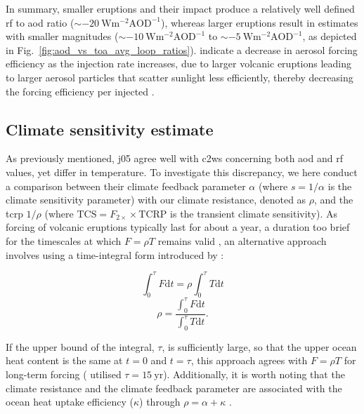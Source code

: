 \documentclass{ametsocV6.1}
\newcommand{\iso}[1][i]{{#1}njected \ce{SO2}}
\begin{document}
In summary, smaller eruptions and their impact produce a relatively well defined
\gls{rf} to \gls{aod} ratio (\(\sim \SI{-20}{\watt\metre^{-2}\mathrm{AOD}^{-1}}\)),
whereas larger eruptions result in estimates with smaller magnitudes (\(\sim
\SI{-10}{\watt\metre^{-2}\mathrm{AOD}^{-1}}\) to \(\sim
\SI{-5}{\watt\metre^{-2}\mathrm{AOD}^{-1}}\), as depicted in
Fig.~\ref{fig:aod_vs_toa_avg_loop_ratios}). \citet{niemeier2017} indicate a decrease in
aerosol forcing efficiency as the injection rate increases, due to larger volcanic
eruptions leading to larger aerosol particles that scatter sunlight less efficiently,
thereby decreasing the forcing efficiency per \iso{} \citep{english2013, timmreck2018}.

\subsection{Climate sensitivity estimate}

As previously mentioned, \gls{j05} agree well with \gls{c2ws} concerning both \gls{aod}
and \gls{rf} values, yet differ in temperature. To investigate this discrepancy, we here
conduct a comparison between their climate feedback parameter \(\alpha \) (where
\(s=1/\alpha \) is the climate sensitivity parameter) with our climate resistance,
denoted as \(\rho \), and the \gls{tcrp} \(1/\rho\) (where
\(\mathrm{TCS}=F_{2\times}\times \mathrm{TCRP}\) is the transient climate sensitivity).
As forcing of volcanic eruptions typically last for about a year, a duration too brief
for the timescales at which \(F=\rho T\) remains valid \citep{gregory2016}, an
alternative approach involves using a time-integral form introduced by
\citet{merlis2014}:

\begin{equation}
  \int_0^{\tau}F \mathrm{d}t=\rho\int_{0}^{\tau}T \mathrm{d}t
\end{equation}
\begin{equation}
  \rho=\frac{\int_0^{\tau}F \mathrm{d}t}{\int_{0}^{\tau}T \mathrm{d}t}.
  \label{eq:climate-resistance}
\end{equation}

If the upper bound of the integral, \(\tau \), is sufficiently large, so that the upper
ocean heat content is the same at \(t=0\) and \(t=\tau \), this approach agrees with
\(F=\rho T\) for long-term forcing \citep{gregory2016} (\citet{merlis2014} utilised
\(\tau =\SI{15}{\mathrm{yr}}\)). Additionally, it is worth noting that the climate
resistance and the climate feedback parameter are associated with the ocean heat uptake
efficiency (\(\kappa \)) through \(\rho =\alpha +\kappa \) \citep{gregory2016}.
\end{document}
